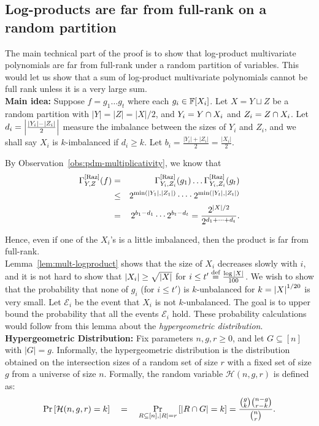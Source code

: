 \subsection{Log-products are far from full-rank on a random
  partition}

The main technical part of the proof is to show that log-product multivariate polynomials are far from full-rank under a random partition of variables. This would let us show that a sum of log-product multivariate polynomials cannot be full rank unless it is a very large sum.\\

{\bf Main idea: } Suppose $f = g_1 \dots g_t$ where each $g_i \in \mathbb{F}[X_i]$. Let $X = Y \sqcup Z$ be a random partition with $|Y| = |Z| = |X|/2$, and $Y_i = Y \cap X_i$ and $Z_i = Z \cap X_i$. Let $d_i = \left|\frac{|Y_i| - |Z_i|}{2}\right|$ measure the imbalance between the sizes of $Y_i$ and $Z_i$, and we shall say $X_i$ is $k$-imbalanced if $d_i \geq k$. Let $b_i = \frac{|Y_i| + |Z_i|}{2} = \frac{|X_i|}{2}$.

By Observation~\ref{obs:pdm-multiplicativity}, we know that 
\begin{eqnarray*}
\Gamma^{\mathrm{[Raz]}}_{Y,Z}(f) & = & \Gamma^{\mathrm{[Raz]}}_{Y_i,Z_i}(g_1) \dots \Gamma^{\mathrm{[Raz]}}_{Y_i,Z_i}(g_t)\\
 & \leq & 2^{\min(|Y_1|,|Z_1|)} \cdots  \cdot 2^{\min(|Y_t|,|Z_t|)}\\ 
 & = & 2^{b_1  - d_1} \cdots 2^{b_t - d_t} = \frac{2^{|X|/2}}{2^{d_1 + \dots + d_t}}.
\end{eqnarray*}

Hence, even if one of the $X_i$'s is a little imbalanced, then the product is far from full-rank. \\

Lemma~\ref{lem:mult-logproduct} shows that the size of $X_i$ decreases slowly with $i$, and it is not hard to show that $\left|X_i\right| \geq \sqrt{\left|X\right|}$ for $i \leq t'\stackrel{\text{def}}{=}\frac{\log{\left|X\right|}}{100}$. We wish to show that the probability that none of $g_i$ (for $i\leq t'$) is $k$-unbalanced for $k = \left|X\right|^{1/20}$ is very small. Let $\mathcal{E}_i$ be the event that $X_i$ is not $k$-unbalanced. The goal is to upper bound the probability that all the events $\mathcal{E}_i$ hold. These probability calculations would follow from this lemma about the \emph{hypergeometric distribution}.\\

{\bf Hypergeometric Distribution: } Fix parameters $n, g, r \geq 0$, and let $G \subseteq [n]$ with $|G| = g$. Informally, the hypergeometric distribution is the distribution obtained on the intersection sizes of a random set of size $r$ with a fixed set of size $g$ from a universe of size $n$. 
Formally, the random variable $\mathcal{H}(n,g,r)$ is defined as:
$$
\Pr\left[\mathcal{H}(n,g,r) = k\right] \quad = \quad \Pr_{R\subseteq [n],|R| = r}\left[\left|R \cap G\right| = k\right] = \frac{\binom{g}{k}\binom{n-g}{r-k}}{\binom{n}{r}}.
$$


